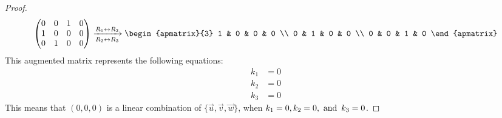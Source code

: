 \documentclass{article}
\begin{document}
\begin{enumerate}
\begin{proof}
\[\begin{pmatrix}
                0 & 0 & 1 & 0 \\
                1 & 0 & 0 & 0 \\
                0 & 1 & 0 & 0
            \end{pmatrix} \xrightarrow[R_2 \leftrightarrow R_3]{R_1 \leftrightarrow R_2}
            \begin{apmatrix}{3}
                1 & 0 & 0 & 0 \\
                0 & 1 & 0 & 0 \\
                0 & 0 & 1 & 0
            \end{apmatrix}
        \]
        This augmented matrix represents the following equations:
        \begin{align*}
            k_1 & = 0 \\
            k_2 & = 0 \\
            k_3 & = 0
        \end{align*}
        This means that $(0,0,0)$ is a linear combination of $\{\vec{u},\vec{v},\vec{w}\}$, when $k_1 = 0, k_2 = 0, \operatorname{~\text{and}~} k_3 = 0$.
    \end{proof}
\end{enumerate}
\end{document}
